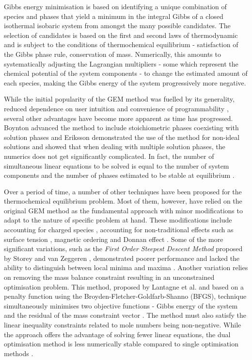 	Gibbs energy minimisation is based on identifying a unique combination of species and phases that yield a minimum in the integral Gibbs of a closed isothermal isobaric system from amongst the many possible candidates. The selection of candidates is based on the first and second laws of thermodynamic and is subject to the conditions of thermochemical equilibrium - satisfaction of the Gibbs phase rule, conservation of mass. Numerically, this amounts to systematically adjusting the Lagrangian multipliers - some which represent the chemical potential of the system components - to change the estimated amount of each species, making the Gibbs energy of the system progressively more negative.

	While the initial popularity of the GEM method was fuelled by its generality,  reduced dependence on user intuition and convenience of programmability \cite{Zeleznik:1968aa}, several other advantages have become more apparent as time has progressed. Boynton advanced the method to include stoichiometric phases coexisting with solution phases \cite{Boynton:1960aa} and Eriksson \cite{Eriksson:1975aa} demonstrated the use of the method for non-ideal solutions and showed that when dealing with multiple solution phases, the numerics does not get significantly complicated. In fact, the number of simultaneous linear equations to be solved is equal to the number of system components and the number of phases estimated to be stable at equilibrium \cite{vanZeggeren11,Boynton:1960aa,Eriksson:1975aa,Eriksson73}.

	Over a period of time, a number of other techniques have been proposed for the thermochemical equilibrium problem. Most of them, however, have relied on the original GEM method \cite{White:58} as the fundamental approach with minor modifications to adapt to the nature of specific problem at hand. These modifications include accounting for charged species \cite{ERIKSSON1979375}, accounting for non-traditional effects such as surface tension \cite{KOUKKARI200618}, magnetic ordering \cite{Eriksson90} and Donnan effect \cite{PAJARRE200658}. Some of the more significant variations, such as the \emph{First Order Steepest Descent Method} proposed by Storey and van Zeggeren \cite{Storey:1964aa}, demonstrated poorer performance and lacked the ability to distinguish between local minima and maxima \cite{Storey:1964aa,vanZeggeren11}. Another variation relies on removing the mass balance constraint resulting in an unconstrained optimisation problem. This method, proposed by Lantagne et al. and based on a penalty function using the Broyden-Fletcher-Goldfarb-Shanno (BFGS), technique simultaneously minimises two objective functions - Gibbs energy of the system and the residual of the mass constraint vector \cite{LANTAGNE1988589,Nocedal06}. The method must also satisfy the linear inequality constraints related to mole numbers being non-negative. While the approach offers the advantage of solving fewer linear equations, the dual optimisation method is less numerically stable compared to single optimisation methods \cite{Nocedal06}.

